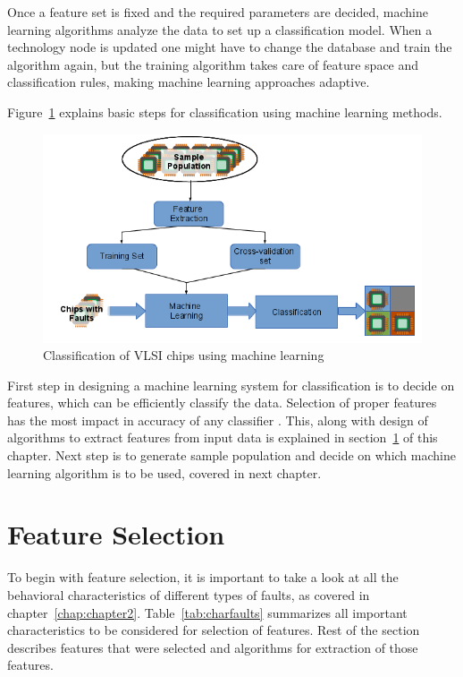 Once a feature set is fixed and the required parameters are decided, machine learning algorithms analyze the data to set up a classification model. When a technology node is updated one might have to change the database and train the algorithm again, but the training algorithm takes care of feature space and classification rules, making machine learning approaches adaptive.

Figure~\ref{fig:mlsteps} explains basic steps for classification using machine learning methods.

\begin{figure}[h]
  \begin{center}
    \captionsetup{justification=centering}
    \includegraphics[scale=0.75]{figures/mlsteps.png}
    \caption{Classification of VLSI chips using machine learning}
    \label{fig:mlsteps}
  \end{center}
\end{figure}

First step in designing a machine learning system for classification is to decide on features, which can be efficiently classify the data. Selection of proper features has the most impact in accuracy of any classifier \cite{Michie1994}. This, along with design of algorithms to extract features from input data is explained in section~\ref{sec:secfs} of this chapter. Next step is to generate sample population and decide on which machine learning algorithm is to be used, covered in next chapter.

\section{Feature Selection}
\label{sec:secfs}
To begin with feature selection, it is important to take a look at all the behavioral characteristics of different types of faults, as covered in chapter~\ref{chap:chapter2}. Table~\ref{tab:charfaults} summarizes all important characteristics to be considered for selection of features. Rest of the section describes features that were selected and algorithms for extraction of those features.

